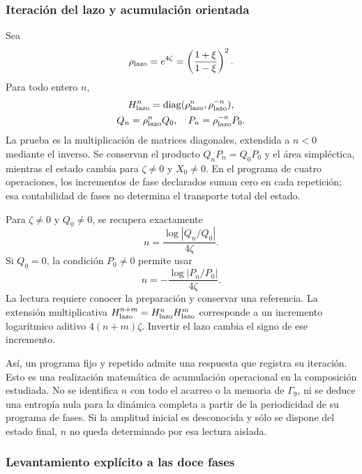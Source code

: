 \subsubsection{Iteración del lazo y acumulación orientada}
\label{md:comp:iteracion}

Sea
\[
 \rho_{\rm lazo}=e^{4\zeta}
 =\left(\frac{1+\xi}{1-\xi}\right)^2.
\]
Para todo entero \(n\),
\begin{equation}
 \begin{gathered}
 H_{\rm lazo}^n
 =\operatorname{diag}(\rho_{\rm lazo}^{n},\rho_{\rm lazo}^{-n}),
 \\
 Q_n=\rho_{\rm lazo}^{n}Q_0,\quad
 P_n=\rho_{\rm lazo}^{-n}P_0.
 \end{gathered}
 \label{md:comp:iteracion-diagonal}
\end{equation}
La prueba es la multiplicación de matrices diagonales, extendida a
\(n<0\) mediante el inverso. Se conservan el producto
\(Q_nP_n=Q_0P_0\) y el área simpléctica, mientras el estado cambia
para \(\zeta\ne0\) y \(X_0\ne0\). En el programa de cuatro
operaciones, los incrementos de fase declarados suman cero en cada
repetición; esa contabilidad de fases no determina el transporte
total del estado.

Para \(\zeta\ne0\) y \(Q_0\ne0\), se recupera exactamente
\[
 n=\frac{\log|Q_n/Q_0|}{4\zeta}.
\]
Si \(Q_0=0\), la condición \(P_0\ne0\) permite usar
\[
 n=-\frac{\log|P_n/P_0|}{4\zeta}.
\]
La lectura requiere conocer la preparación y conservar una referencia.
La extensión multiplicativa
\(H_{\rm lazo}^{n+m}=H_{\rm lazo}^{n}H_{\rm lazo}^{m}\)
corresponde a un incremento logarítmico aditivo \(4(n+m)\zeta\).
Invertir el lazo cambia el signo de ese incremento.

Así, un programa fijo y repetido admite una respuesta que registra
su iteración. Esto es una realización matemática de acumulación
operacional en la composición estudiada. No se identifica \(n\)
con todo el acarreo o la memoria de \(\Gamma_9\), ni se deduce una
entropía nula para la dinámica completa a partir de la periodicidad
de su programa de fases. Si la amplitud inicial es desconocida y
sólo se dispone del estado final, \(n\) no queda determinado por
esa lectura aislada.

\subsubsection{Levantamiento explícito a las doce fases}
\label{md:comp:levantamiento}

